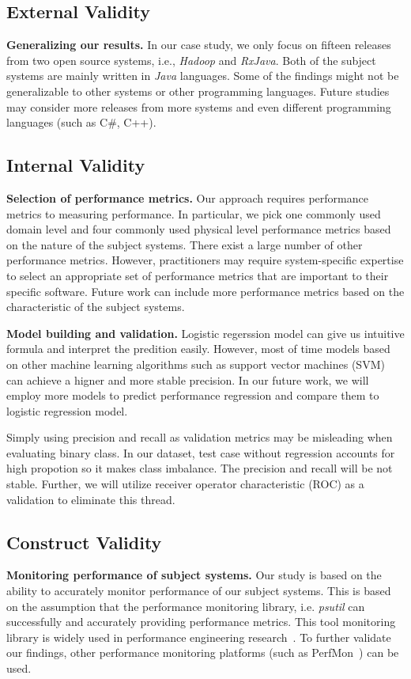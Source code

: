 \subsection{External Validity}

\textbf{Generalizing our results. }In our case study, we only focus on fifteen releases from two open source systems, i.e., \emph{Hadoop} and \emph{RxJava}. Both of the subject systems are mainly written in \emph{Java} languages. Some of the findings might not be generalizable to other systems or other programming languages. Future studies may consider more releases from more systems and even different programming languages (such as C\#, C++). 

\subsection{Internal Validity}

\textbf{Selection of performance metrics.} Our approach requires performance metrics to measuring performance. In particular, we pick one commonly used domain level and four commonly used physical level performance metrics based on the nature of the subject systems. There exist a large number of other performance metrics. However, practitioners may require system-specific expertise to select an appropriate set of performance metrics that are important to their specific software. Future work can include more performance metrics based on the characteristic of the subject systems. 

\textbf{Model building and validation.} 
Logistic regerssion model can give us intuitive formula and  interpret the predition easily. However, most of time models based on other machine learning algorithms such as support vector machines (SVM) can achieve a higner and more stable precision. In our future work, we will employ more models to predict performance regression and compare them to logistic regression model.

Simply using precision and recall as validation metrics may be misleading when evaluating binary class. In our dataset, test case without regression accounts for high propotion so it makes class imbalance. The precision and recall will be not stable.  Further, we will utilize receiver operator characteristic (ROC) as a validation to eliminate this thread.
\subsection{Construct Validity}

\textbf{Monitoring performance of subject systems.} Our study is based on the ability to accurately monitor performance of our subject systems. This is based on the assumption that the performance monitoring library, i.e. \emph{psutil} can successfully and accurately providing performance metrics. This tool monitoring library is widely used in performance engineering research~\cite{peterfse,tarekmsr16}. To further validate our findings, other performance monitoring platforms (such as PerfMon~\cite{perfmon}) can be used. 



